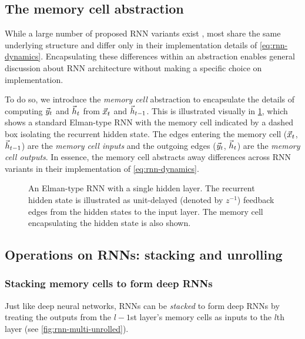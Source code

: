 \subsection{The memory cell abstraction}

While a large number of proposed RNN variants exist
\citep{elman1990finding,jordan1997serial,hochreiter1997long,cho2014learning,Koutnik2014,Mikolov2015},
most share the same underlying structure and differ only in their
implementation details of \cref{eq:rnn-dynamics}. Encapsulating these
differences within an abstraction enables general discussion about RNN
architecture without making a specific choice on implementation.

To do so, we introduce the \emph{memory cell} abstraction to encapsulate the
details of computing $\vec{y}_t$ and $\vec{h}_t$ from $\vec{x}_t$ and $\vec{h}_{t-1}$. This is
illustrated visually in \cref{fig:rnn-elman}, which shows a standard Elman-type
RNN \citep{elman1990finding} with the memory cell indicated by a dashed box
isolating the recurrent hidden state. The edges entering the memory cell
($\vec{x}_t$, $\vec{h}_{t-1}$) are the \emph{memory cell inputs} and the outgoing edges
($\vec{y}_t$, $\vec{h}_t$) are the \emph{memory cell outputs}. In essence, the memory
cell abstracts away differences across RNN variants in their implementation of
\cref{eq:rnn-dynamics}.

\begin{figure}[tb]
  \centering
  
  \caption{An Elman-type RNN with a single hidden layer. The recurrent hidden
    state is illustrated as unit-delayed (denoted by $z^{-1}$) feedback edges
    from the hidden states to the input layer. The memory cell encapsulating the
  hidden state is also shown.}
  \label{fig:rnn-elman}
\end{figure}

\subsection{Operations on RNNs: stacking and unrolling}

\subsubsection{Stacking memory cells to form deep RNNs}

Just like deep neural networks, RNNs can be \emph{stacked} to form deep RNNs
\citep{el1995hierarchical,schmidhuber1992learning} by treating the
outputs from the $l-1$st layer's memory cells as inputs to the $l$th layer (see \cref{fig:rnn-multi-unrolled}).

